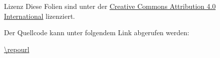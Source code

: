 
\begin{frame}{Lizenz}
    Diese Folien sind unter der \href{https://creativecommons.org/licenses/by/4.0/}{Creative Commons Attribution 4.0 International} lizenziert. \ccby

    Der Quellcode kann unter folgendem Link abgerufen werden:

    \url{\repourl}
\end{frame}
